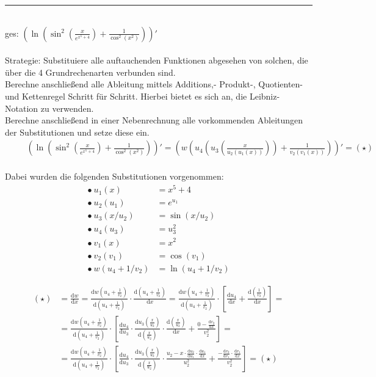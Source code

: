 \documentclass{article}
\newcommand{\diff}{\mathrm{d}}
\newcommand{\lr}[1]{\left(#1\right)}
\newcommand{\lreck}[1]{\left[#1\right]}
\begin{document}
{\color{blue}
\hrule
	\\
	ges: $\lr{ \ln \lr{ \sin^2 \lr{ \frac{x}{e^{x^5+4}} } + \frac{1}{\cos^2(x^2)} } }'$\\
	\\
	Strategie: Substituiere alle auftauchenden Funktionen abgesehen von solchen, die über die 4 Grundrechenarten verbunden sind.\\
	Berechne anschließend alle Ableitung mittels Additions,- Produkt-, Quotienten- und Kettenregel Schritt für Schritt. Hierbei bietet es sich an, die Leibniz-Notation zu verwenden.\\
	Berechne anschließend in einer Nebenrechnung alle vorkommenden Ableitungen der Substitutionen und setze diese ein.
		\begin{align*}
			&\phantom{=} \lr{ \ln \lr{ \sin^2 \lr{ \frac{x}{e^{x^5+4}} } + \frac{1}{\cos^2(x^2)} } }' = \lr{ w \lr{ u_4 \lr{ u_3 \lr{ \frac{x}{u_2(u_1(x))} } } + \frac{1}{v_2(v_1(x))} } }' = (\star) \\
		\end{align*}
	
	Dabei wurden die folgenden Substitutionen vorgenommen:
		\begin{align*}
			\bullet \ u_1(x) &= x^5+4 \\
			\bullet \ u_2(u_1) &= e^{u_1} \\
			\bullet \ u_3\lr{ x/u_2 } &= \sin\lr{ x/u_2 } \\
			\bullet \ u_4(u_3) &= u_3^2 \\
			\bullet \ v_1(x) &= x^2 \\
			\bullet \ v_2(v_1) &= \cos(v_1) \\
			\bullet \ w\lr{ u_4 + 1/v_2 } &= \ln\lr{ u_4 + 1/v_2 }
		\end{align*}


\newpage


		\begin{align*}
			(\star) &= \frac{\diff w}{\diff x} = \frac{\diff w \lr{u_4 + \frac{1}{v_2}}}{\diff \lr{u_4 + \frac{1}{v_2}}} \cdot \frac{\diff \lr{u_4 + \frac{1}{v_2}}}{\diff x} = \frac{\diff w \lr{u_4 + \frac{1}{v_2}}}{\diff \lr{u_4 + \frac{1}{v_2}}} \cdot \lreck{ \frac{\diff u_4}{\diff x} + \frac{\diff \lr{ \frac{1}{v_2} }}{\diff x} } = \\
			&= \frac{\diff w \lr{u_4 + \frac{1}{v_2}}}{\diff \lr{u_4 + \frac{1}{v_2}}} \cdot \lreck{ \frac{\diff u_4}{\diff u_3} \cdot \frac{\diff u_3 \lr{ \frac{x}{u_2} } }{\diff \lr{ \frac{x}{u_2} }} \cdot \frac{\diff \lr{ \frac{x}{u_2} }}{\diff x} + \frac{0 - \frac{\diff v_2}{\diff x}}{v_2^2} } = \\
			&= \frac{\diff w \lr{u_4 + \frac{1}{v_2}}}{\diff \lr{u_4 + \frac{1}{v_2}}} \cdot \lreck{ \frac{\diff u_4}{\diff u_3} \cdot \frac{\diff u_3 \lr{ \frac{x}{u_2} } }{\diff \lr{ \frac{x}{u_2} }} \cdot \frac{u_2 - x \cdot \frac{\diff u_2}{\diff u_1} \cdot \frac{\diff u_1}{\diff x}}{u_2^2} + \frac{- \frac{\diff v_2}{\diff v_1} \cdot \frac{\diff v_1}{\diff x}}{v_2^2} } = (\star)
		\end{align*}


}
\end{document}
